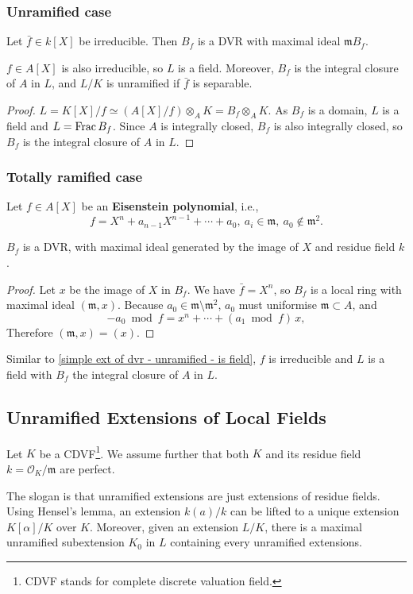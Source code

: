 \subsubsection*{Unramified case}
Let $\bar{f}\in k[X]$ be irreducible. Then $B_f$ is a DVR with maximal ideal $\mathfrak{m}B_f$.
\begin{corollary}\label{simple ext of dvr - unramified - is field}
    $f\in A[X]$ is also irreducible, so $L$ is a field.
    Moreover, $B_f$ is the integral closure of $A$ in $L$, and $L/K$ is unramified if $\bar{f}$ is separable.
\end{corollary}
\begin{proof}
    $L = K[X]/f \simeq \left( A[X]/f \right)\otimes_{A} K = B_f\otimes_A K$.
    As $B_f$ is a domain, $L$ is a field and $L = \operatorname{Frac} B_f$.
    Since $A$ is integrally closed, $B_f$ is also integrally closed, so $B_f$ is the integral closure of $A$ in $L$.
\end{proof}
\subsubsection*{Totally ramified case}
Let $f\in A[X]$ be an \textbf{Eisenstein polynomial}, i.e., \[f = X^n + a_{n-1}X^{n-1} + \cdots  + a_0,\ a_i\in\mathfrak{m},\ a_0\notin\mathfrak{m}^2.\]
\begin{proposition}
    $B_f$ is a DVR, with maximal ideal generated by the image of $X$ and residue field $k$.
\end{proposition}
\begin{proof}
    Let $x$ be the image of $X$ in $B_f$.
    We have $\bar{f} = X^n$, so $B_f$ is a local ring with maximal ideal $(\mathfrak{m}, x)$.
    Because $a_0\in\mathfrak{m\setminus m^2}$, $a_0$ must uniformise $\mathfrak{m}\subset A$, and \[-a_0\bmod f = x^n + \cdots + (a_1\bmod f)\,x,\] Therefore $(\mathfrak{m}, x) = (x)$.
\end{proof}
Similar to \cref{simple ext of dvr - unramified - is field}, $f$ is irreducible and $L$ is a field with $B_f$ the integral closure of $A$ in $L$.

\subsection{Unramified Extensions of Local Fields}
Let $K$ be a CDVF\footnote{CDVF stands for complete discrete valuation field.}. We assume further that both $K$ and its residue field $k = \mathcal{O}_K/\mathfrak{m}$ are perfect.

The slogan is that unramified extensions are just extensions of residue fields.
Using Hensel's lemma, an extension $k(a)/k$ can be lifted to a unique extension $K[\alpha]/K$ over $K$. Moreover, given an extension $L/K$, there is a maximal unramified subextension $K_0$ in $L$ containing every unramified extensions.

